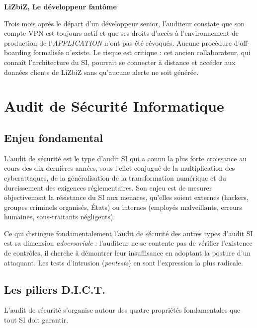 \begin{boxlizbiz}
\textbf{LiZbiZ, Le développeur fantôme}

Trois mois après le départ d'un développeur senior, l'auditeur constate que son compte VPN est toujours actif et que ses droits d'accès à l'environnement de production de l'\textit{APPLICATION} n'ont pas été révoqués. Aucune procédure d'off-boarding formalisée n'existe. Le risque est critique : cet ancien collaborateur, qui connaît l'architecture du SI, pourrait se connecter à distance et accéder aux données clients de LiZbiZ sans qu'aucune alerte ne soit générée.
\end{boxlizbiz}


\section{Audit de Sécurité Informatique}

\subsection{Enjeu fondamental}

L'audit de sécurité est le type d'audit SI qui a connu la plus forte croissance au cours des dix dernières années, sous l'effet conjugué de la multiplication des cyberattaques, de la généralisation de la transformation numérique et du durcissement des exigences réglementaires. Son enjeu est de mesurer objectivement la résistance du SI aux menaces, qu'elles soient externes (hackers, groupes criminels organisés, États) ou internes (employés malveillants, erreurs humaines, sous-traitants négligents).

Ce qui distingue fondamentalement l'audit de sécurité des autres types d'audit SI est sa dimension \textit{adversariale} : l'auditeur ne se contente pas de vérifier l'existence de contrôles, il cherche à démontrer leur insuffisance en adoptant la posture d'un attaquant. Les tests d'intrusion (\textit{pentests}) en sont l'expression la plus radicale.

\subsection{Les piliers D.I.C.T.}

L'audit de sécurité s'organise autour des quatre propriétés fondamentales que tout SI doit garantir.


